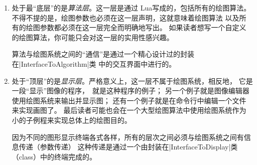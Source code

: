 \begin{enumerate}
\item 处于最“底层”的是\emph{算法层}。这一层是通过 Lua写成的，包括所有的绘图算法。
不得不提的是，绘图参数也必须在这一层声明，这就意味着绘图算法
以及所有的绘图参数都必须在这一层完全而明确地写出。
如果读者想写一个自定义的绘图算法，你可能只会对这一层的实用性感兴趣。

算法与绘图系统之间的“通信”是通过一个精心设计过的封装在|InterfaceToAlgorithm|类
中的交互界面中进行的。
\item 处于“顶层”的是\emph{显示层}。严格意义上，这一层不属于绘图系统，相反地，
它是一段“显示”图像的程序，\tikzname\ 就是这种程序的例子；
另一个例子就是图像编辑器使用绘图系统来输出并显示图；
还有一个例子就是在命令行中编辑一个文件来实现画图了。
最后读者可能也会在一个大型绘图算法中使用绘图系统作为小的子例程来实现总体上的绘图目的。

因为不同的图形显示终端各式各样，所有的层次之间必须与绘图系统之间有信息传递（参数传递）
这种传递是通过一个由封装在|InterfaceToDisplay|类（class）中的终端完成的。


\end{enumerate}
